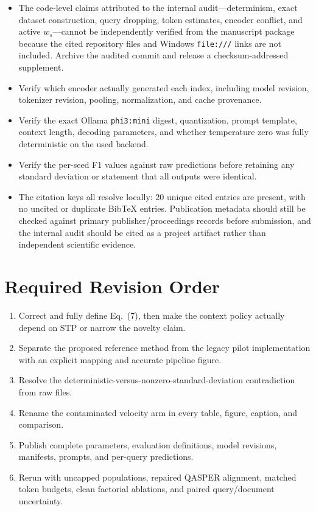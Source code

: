 \documentclass[11pt]{article}
\begin{document}
\begin{itemize}
  \item The code-level claims attributed to the internal audit---determinism, exact dataset construction, query dropping, token estimates, encoder conflict, and active $w_s$---cannot be independently verified from the manuscript package because the cited repository files and Windows \texttt{file:///} links are not included. Archive the audited commit and release a checksum-addressed supplement.
  \item Verify which encoder actually generated each index, including model revision, tokenizer revision, pooling, normalization, and cache provenance.
  \item Verify the exact Ollama \texttt{phi3:mini} digest, quantization, prompt template, context length, decoding parameters, and whether temperature zero was fully deterministic on the used backend.
  \item Verify the per-seed F1 values against raw predictions before retaining any standard deviation or statement that all outputs were identical.
  \item The citation keys all resolve locally: 20 unique cited entries are present, with no uncited or duplicate BibTeX entries. Publication metadata should still be checked against primary publisher/proceedings records before submission, and the internal audit should be cited as a project artifact rather than independent scientific evidence.
\end{itemize}

\section*{Required Revision Order}

\begin{enumerate}
  \item Correct and fully define Eq.~(7), then make the context policy actually depend on STP or narrow the novelty claim.
  \item Separate the proposed reference method from the legacy pilot implementation with an explicit mapping and accurate pipeline figure.
  \item Resolve the deterministic-versus-nonzero-standard-deviation contradiction from raw files.
  \item Rename the contaminated velocity arm in every table, figure, caption, and comparison.
  \item Publish complete parameters, evaluation definitions, model revisions, manifests, prompts, and per-query predictions.
  \item Rerun with uncapped populations, repaired QASPER alignment, matched token budgets, clean factorial ablations, and paired query/document uncertainty.
\end{enumerate}
\end{document}
